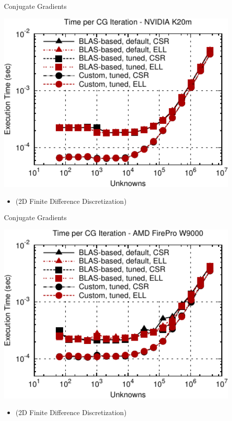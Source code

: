 \begin{frame}[fragile]{Conjugate Gradients}
 \begin{block}{}
 \begin{center}
  \vspace*{-0.5cm}
  \includegraphics[width=0.9\textwidth]{figures/cg-k20m-3}
 \end{center}

 \begin{itemize}
  \item   \vspace*{-0.3cm} {\small (2D Finite Difference Discretization)}
 \end{itemize}
 \end{block}   
\end{frame}


\begin{frame}[fragile]{Conjugate Gradients}
 \begin{block}{}
 \begin{center}
  \vspace*{-0.5cm}
  \includegraphics[width=0.9\textwidth]{figures/cg-firepro-w9000-3}
 \end{center}

 \begin{itemize}
  \item   \vspace*{-0.3cm} {\small (2D Finite Difference Discretization)}
 \end{itemize}
 \end{block}   
\end{frame}


